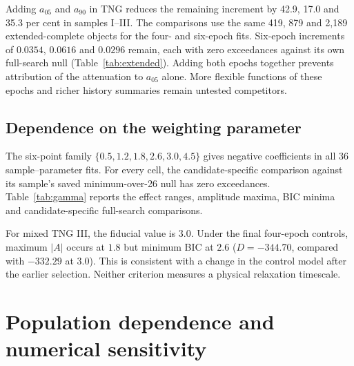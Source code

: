 \documentclass[11pt,a4paper]{article}
\begin{document}
Adding $a_{05}$ and $a_{90}$ in TNG reduces the remaining increment by 42.9, 17.0 and 35.3 per cent in samples I--III. The comparisons use the same 419, 879 and 2,189 extended-complete objects for the four- and six-epoch fits. Six-epoch increments of $0.0354$, $0.0616$ and $0.0296$ remain, each with zero exceedances against its own full-search null (Table~\ref{tab:extended}). Adding both epochs together prevents attribution of the attenuation to $a_{05}$ alone. More flexible functions of these epochs and richer history summaries remain untested competitors.
\begin{table}[htbp]\centering\small

\caption{Four- and six-epoch comparisons on identical TNG populations. The six-epoch model adds $a_{05}$ and $a_{90}$. Conventional OLS errors are shown. Each six-epoch statistic attains $1/1001$ against its own 26-candidate rescan null.}\label{tab:extended}
\end{table}

\subsection{Dependence on the weighting parameter}
The six-point family $\{0.5,1.2,1.8,2.6,3.0,4.5\}$ gives negative coefficients in all 36 sample--parameter fits. For every cell, the candidate-specific comparison against its sample's saved minimum-over-26 null has zero exceedances. Table~\ref{tab:gamma} reports the effect ranges, amplitude maxima, BIC minima and candidate-specific full-search comparisons.
\begin{table}[htbp]\centering\footnotesize

\caption{Six-point effect ranges and candidate-specific full-search comparisons. The last column is the largest exceedance count among that sample's six displayed values. $\gamma_{\max|A|}$ describes the six-point amplitude maximum; $\gamma_{\min\mathrm{BIC}}$ is the minimum over the full candidate family under the current controls. Ranges are descriptive, not uncertainty intervals.}\label{tab:gamma}
\end{table}

For mixed TNG III, the fiducial value is $3.0$. Under the final four-epoch controls, maximum $|A|$ occurs at $1.8$ but minimum BIC at $2.6$ ($D=-344.70$, compared with $-332.29$ at $3.0$). This is consistent with a change in the control model after the earlier selection. Neither criterion measures a physical relaxation timescale.

\section{Population dependence and numerical sensitivity}\label{sec:population}
\end{document}
